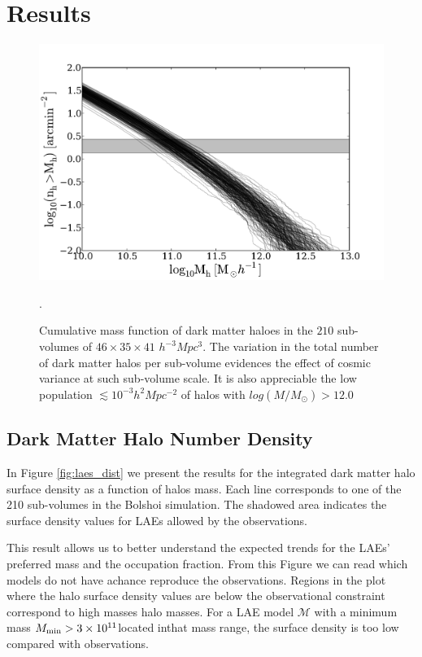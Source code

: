 \documentclass[usenatbib]{mn2e}
\newcommand{\hMsun}{{\ifmmode{h^{-1}{\rm {M_{\odot}}}}\else{$h^{-1}{\rm{M_{\odot}}}$}\fi}}
\begin{document}
\section{Results}


\begin{figure}
\begin{center}
\includegraphics[width=1.00\linewidth,angle=0]{./plots/Fig1.pdf}
\caption{ \label{figure:laes_dist} Cumulative mass function of dark
  matter haloes in the $210$ sub-volumes of $46\times 35\times 41$
  $h^{-3}Mpc^{3}$. The variation in the total number of dark matter
  halos per sub-volume  evidences the effect of cosmic variance at
  such sub-volume scale. It is also appreciable the low population
  $\lesssim10^{-3}h^{2}Mpc^{-2}$ of halos with
  $log(M/M_{\odot})>12.0$}. 
\end{center} 
\end{figure}


\subsection{Dark Matter Halo Number Density}
In Figure \ref{fig:laes_dist} we present the results for  the
integrated dark matter halo surface density as a function of halos
mass. Each line corresponds to one of the 210 sub-volumes in the
Bolshoi simulation. The shadowed area indicates the surface density
values for LAEs allowed by the observations.  
 
This result allows us to better understand the expected trends for the
LAEs' preferred mass and the occupation fraction.  From this Figure we
can read which models do not have achance reproduce the
observations. Regions in the plot where the halo surface density
values are below the observational constraint correspond to high
masses halo masses. For a LAE model ${\mathcal M}$ with a minimum mass
$M_{\rm   min}> 3 \times 10^{11}$\hMsun located inthat mass range, the
surface density is too low compared with observations.   
\end{document}
